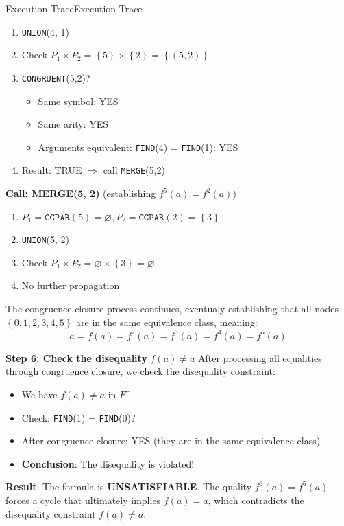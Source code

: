 \documentclass[a4paper]{article}
\theoremstyle{definition}
\begin{document}
\begin{theorem}{Execution Trace}{Execution Trace}
\begin{enumerate}
	\item \texttt{UNION}(4, 1)
	\item Check \( P_1 \times P_2 = \left\{5\right\} \times \left\{2\right\} = \left\{(5,2)\right\} \)   
	\item \texttt{CONGRUENT}(5,2)?
	\begin{itemize}
		\item Same symbol: YES
		\item Same arity: YES 
		\item Arguments equivalent: \texttt{FIND}(4) = \texttt{FIND}(1): YES
	\end{itemize}
	\item Result: TRUE \( \Rightarrow \) call \texttt{MERGE}(5,2)
\end{enumerate}
\vspace{1em}
\noindent
\newline
\textbf{Call: MERGE(5, 2)} (establishing \( f^5(a) = f^2(a) \))
\begin{enumerate}
	\item \( P_1 = \texttt{CCPAR}(5) = \varnothing, P_2 = \texttt{CCPAR}(2) = \left\{3\right\} \)    
	\item \texttt{UNION}(5, 2)
	\item Check \( P_1 \times P_2 = \varnothing \times \left\{3\right\} = \varnothing \)   
	\item No further propagation
\end{enumerate}
The congruence closure process continues, eventualy establishing that all nodes \( \left\{0,1,2,3,4,5\right\} \) are 
in the same equivalence class, meaning:
\[
  a = f(a) = f^2(a) = f^3(a) = f^4(a) = f^5(a)
\]
\end{theorem}
\textbf{Step 6: Check the disequality} \( f(a) \neq a \)   
\vspace{1em}
\noindent
\newline
After processing all equalities through congruence closure, we check the disequality constraint:
\begin{itemize}
	\item We have \( f(a) \neq a \) in \( F^- \)   
	\item Check: \texttt{FIND}(1) = \texttt{FIND}(0)?
	\item After congruence closure: YES (they are in the same equivalence class)
	\item \textbf{Conclusion}: The disequality is violated!
\end{itemize}
\textbf{Result}: The formula is \textbf{UNSATISFIABLE}. The quality \( f^3(a) = f^5(a) \) forces a cycle that 
ultimately implies \( f(a) = a \), which contradicts the disequality constraint \( f(a) \neq a \).
\end{document}
